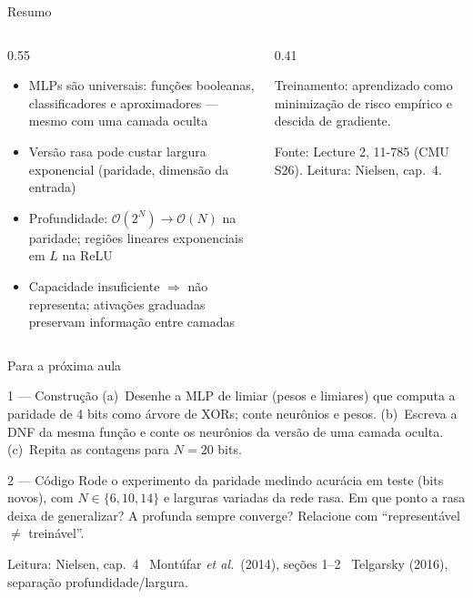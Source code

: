 \documentclass[aspectratio=169, 11pt]{beamer}
\begin{document}
\begin{frame}{Resumo}

  \begin{columns}[T]
    \begin{column}{0.55\textwidth}
      \begin{itemize}\setlength{\itemsep}{0.35ex}
        \item MLPs são universais: funções booleanas, classificadores e
              aproximadores — mesmo com uma camada oculta
        \item Versão rasa pode custar largura exponencial (paridade,
              dimensão da entrada)
        \item Profundidade: $\mathcal{O}(2^N) \to \mathcal{O}(N)$ na
              paridade; regiões lineares exponenciais em $L$ na ReLU
        \item Capacidade insuficiente $\Rightarrow$ não representa;
              ativações graduadas preservam informação entre camadas
      \end{itemize}
    \end{column}
    \begin{column}{0.41\textwidth}
      \begin{tcolorbox}[iccaixa=icVerde, title={Próxima aula}]
        Treinamento: aprendizado como minimização de risco empírico e
        descida de gradiente.
      \end{tcolorbox}
      \smallskip
      {\small\color{icCinza} Fonte: Lecture 2, 11-785 (CMU S26).
      Leitura: Nielsen, cap.\ 4.}
    \end{column}
  \end{columns}
\end{frame}

\begin{frame}{Para a próxima aula}

  \begin{exbox}{1 --- Construção}
    (a)~Desenhe a MLP de limiar (pesos e limiares) que computa a paridade de
    4 bits como árvore de XORs; conte neurônios e pesos.
    (b)~Escreva a DNF da mesma função e conte os neurônios da versão de uma
    camada oculta. (c)~Repita as contagens para $N = 20$ bits.
  \end{exbox}

  \begin{exbox}{2 --- Código}
    Rode o experimento da paridade medindo acurácia em teste (bits novos),
    com $N \in \{6, 10, 14\}$ e larguras variadas da rede rasa. Em que ponto
    a rasa deixa de generalizar? A profunda sempre converge? Relacione com
    ``representável $\ne$ treinável''.
  \end{exbox}

  \medskip
  {\small\color{icCinza}
  Leitura: Nielsen, cap.\ 4 \textbullet\ Montúfar \emph{et al.}\ (2014),
  seções 1--2 \textbullet\ Telgarsky (2016), separação profundidade/largura.}
\end{frame}
\end{document}

